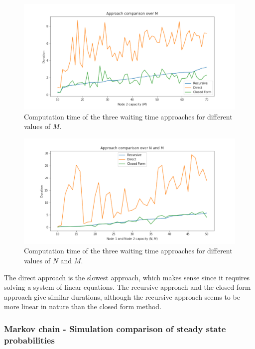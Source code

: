 \begin{figure}[H]
    \includegraphics[width=\textwidth]{chapters/03_queueing_model/img/numeric_results_and_timings/waiting_time_formulas_comparison/algorithm_duration_over_M.pdf}
    \caption{Computation time of the three waiting time approaches for different values
    of \(M\).}
    \label{fig:waiting_time_algorithm_duration_over_M}
\end{figure}


\begin{figure}[H]
    \includegraphics[width=\textwidth]{chapters/03_queueing_model/img/numeric_results_and_timings/waiting_time_formulas_comparison/algorithm_duration_over_N_and_M.pdf}
    \caption{Computation time of the three waiting time approaches for different values
    of \(N\) and \(M\).}
    \label{fig:waiting_time_algorithm_duration_over_N_and_M}
\end{figure}

The direct approach is the slowest approach, which makes sense since it requires
solving a system of linear equations.
The recursive approach and the closed form approach give similar durations,
although the recursive approach seems to be more linear in nature than the
closed form method. 


\subsubsection{Markov chain - Simulation comparison of steady state probabilities}


